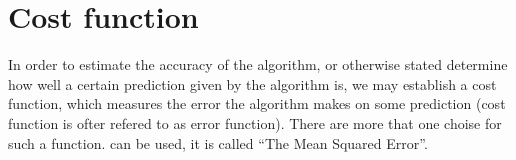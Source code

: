 %
%
%
%
%
%
%


\section{Cost function}\label{cost}

In order to estimate the accuracy of the algorithm, or otherwise stated determine how well a certain prediction given by the algorithm is, we may establish a cost function, which measures the error the algorithm makes on some prediction (cost function is ofter refered to as error function). There are more that one choise for such a function.  can be used, it is called ``The Mean Squared Error''.

